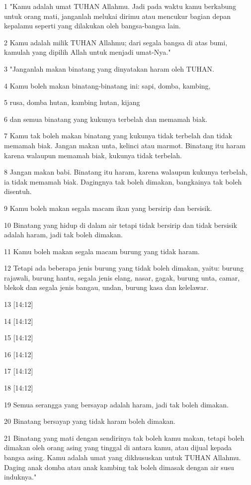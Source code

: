 \par 1 "Kamu adalah umat TUHAN Allahmu. Jadi pada waktu kamu berkabung untuk orang mati, janganlah melukai dirimu atau mencukur bagian depan kepalamu seperti yang dilakukan oleh bangsa-bangsa lain.
\par 2 Kamu adalah milik TUHAN Allahmu; dari segala bangsa di atas bumi, kamulah yang dipilih Allah untuk menjadi umat-Nya."
\par 3 "Janganlah makan binatang yang dinyatakan haram oleh TUHAN.
\par 4 Kamu boleh makan binatang-binatang ini: sapi, domba, kambing,
\par 5 rusa, domba hutan, kambing hutan, kijang
\par 6 dan semua binatang yang kukunya terbelah dan memamah biak.
\par 7 Kamu tak boleh makan binatang yang kukunya tidak terbelah dan tidak memamah biak. Jangan makan unta, kelinci atau marmot. Binatang itu haram karena walaupun memamah biak, kukunya tidak terbelah.
\par 8 Jangan makan babi. Binatang itu haram, karena walaupun kukunya terbelah, ia tidak memamah biak. Dagingnya tak boleh dimakan, bangkainya tak boleh disentuh.
\par 9 Kamu boleh makan segala macam ikan yang bersirip dan bersisik.
\par 10 Binatang yang hidup di dalam air tetapi tidak bersirip dan tidak bersisik adalah haram, jadi tak boleh dimakan.
\par 11 Kamu boleh makan segala macam burung yang tidak haram.
\par 12 Tetapi ada beberapa jenis burung yang tidak boleh dimakan, yaitu: burung rajawali, burung hantu, segala jenis elang, nasar, gagak, burung unta, camar, blekok dan segala jenis bangau, undan, burung kasa dan kelelawar.
\par 13 [14:12]
\par 14 [14:12]
\par 15 [14:12]
\par 16 [14:12]
\par 17 [14:12]
\par 18 [14:12]
\par 19 Semua serangga yang bersayap adalah haram, jadi tak boleh dimakan.
\par 20 Binatang bersayap yang tidak haram boleh dimakan.
\par 21 Binatang yang mati dengan sendirinya tak boleh kamu makan, tetapi boleh dimakan oleh orang asing yang tinggal di antara kamu, atau dijual kepada bangsa asing. Kamu adalah umat yang dikhususkan untuk TUHAN Allahmu. Daging anak domba atau anak kambing tak boleh dimasak dengan air susu induknya."
